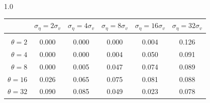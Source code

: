 \documentclass[12pt]{article}
\begin{document}
\begin{table}[h!]
\vspace{10pt}
\begin{subtable}{1.0\textwidth}
    \centering
\begin{tabular}{rccccc}
\hline  
            & \multicolumn{1}{l}{$\sigma_{\eta} =2\sigma_{v}$} & \multicolumn{1}{l}{$\sigma_{\eta} =4\sigma_{v}$} & \multicolumn{1}{l}{$\sigma_{\eta} =8\sigma_{v}$} & \multicolumn{1}{l}{$\sigma_{\eta} =16\sigma_{v}$} & \multicolumn{1}{l}{$\sigma_{\eta} =32\sigma_{v}$} \\ \hline  \vspace{-3mm} \\        
$\theta=2$  & 0.000                                             & 0.000                                             & 0.000                                             & 0.004                                              & 0.126                                              \\ \hline
$\theta=4$  & 0.000                                             & 0.000                                             & 0.004                                             & 0.050                                              & 0.091                                              \\ \hline
$\theta=8$  & 0.000                                             & 0.005                                             & 0.047                                             & 0.074                                              & 0.089                                              \\ \hline
$\theta=16$ & 0.026                                             & 0.065                                             & 0.075                                             & 0.081                                              & 0.088                                              \\ \hline
$\theta=32$ & 0.090                                             & 0.085                                             & 0.049                                             & 0.023                                              & 0.078                                              \\ \hline
\end{tabular}
\end{subtable}


\end{table}
\end{document}
